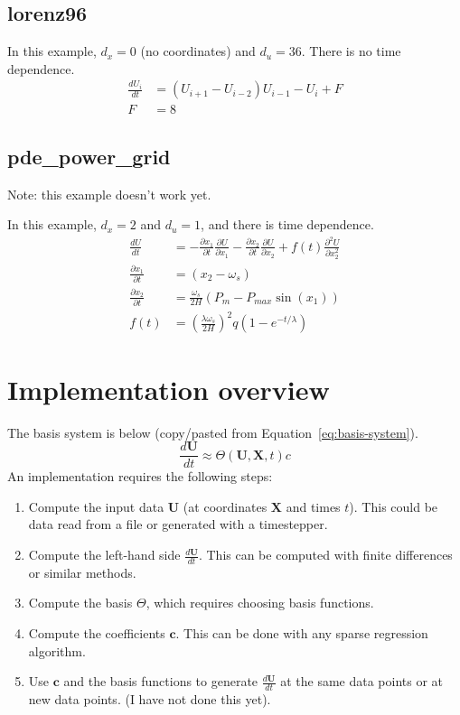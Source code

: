 \documentclass{article}
\let\vec\mathbf
\begin{document}
\subsection{lorenz96}
In this example, $d_x = 0$ (no coordinates) and $d_u = 36$. There is no time dependence.
\begin{align*}
\frac{dU_i}{dt} &= (U_{i+1} - U_{i-2}) U_{i-1} - U_i + F \\
F &= 8
\end{align*}

\subsection{pde\_power\_grid}
Note: this example doesn't work yet.

In this example, $d_x = 2$ and $d_u = 1$, and there is time dependence.
\begin{align*}
\frac{dU}{dt} &= - \frac{\partial x_1}{\partial t} \frac{\partial U}{\partial x_1}
                 - \frac{\partial x_2}{\partial t} \frac{\partial U}{\partial x_2}
                 + f(t) \frac{\partial^2 U}{\partial x_2^2}
\\ \frac{\partial x_1}{\partial t} &= (x_2 - \omega_s)
\\ \frac{\partial x_2}{\partial t} &= \frac{\omega_s}{2H}(P_m - P_{max}\sin(x_1))
\\ f(t) &= \left(\frac{\lambda \omega_s}{2H}\right) ^ 2 q (1-e^{-t/\lambda})
\end{align*}

\section{Implementation overview}

The basis system is below (copy/pasted from Equation~\ref{eq:basis-system}).
\begin{equation}
\frac{d\vec{U}}{dt} \approx \Theta(\vec{U}, \vec{X}, t) c
\end{equation}
An implementation requires the following steps:
\begin{enumerate}
    \item Compute the input data $\vec{U}$ (at coordinates $\vec{X}$ and times $t$). This could be data read from a file or generated with a timestepper.
    \item Compute the left-hand side $\frac{d\vec{U}}{dt}$. This can be computed with finite differences or similar methods.
    \item Compute the basis $\Theta$, which requires choosing basis functions.
    \item Compute the coefficients $\vec{c}$. This can be done with any sparse regression algorithm.
    \item Use $\vec{c}$ and the basis functions to generate $\frac{d\vec{U}}{dt}$ at the same data points or at new data points. (I have not done this yet).
\end{enumerate}
\end{document}
